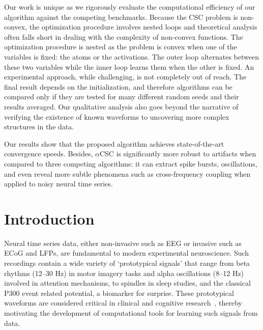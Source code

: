 Our work is unique as we rigorously evaluate the computational efficiency of our algorithm against the competing benchmarks. Because the \ac{CSC} problem is non-convex, the optimization procedure involves nested loops and theoretical analysis often falls short in dealing with the complexity of non-convex functions. 
The optimization procedure is nested as the problem is convex when one of the variables is fixed: the atoms or the activations. The outer loop alternates between these two variables while the inner loop learns them when the other is fixed. An experimental approach, while challenging, is not completely out of reach. The final result depends on the initialization, and therefore algorithms can be compared only if they are tested for many different random seeds and their results averaged. Our qualitative analysis also goes beyond the narrative of verifying the existence of known waveforms to uncovering more complex structures in the data.

Our results
show that the proposed algorithm achieves state-of-the-art convergence speeds. Besides, $\alpha$CSC is
significantly more robust to artifacts when compared to three competing algorithms: it can extract
spike bursts, oscillations, and even reveal more subtle phenomena such as cross-frequency coupling
when applied to noisy neural time series.


\noindent{}%

\clearpage

\section{Introduction}
\label{sec:alphacsc_intro}
Neural time series data, either non-invasive such as \ac{EEG} 
or invasive such as \ac{ECoG} and \acp{LFP}, are fundamental to modern experimental neuroscience. Such recordings contain a wide variety of `prototypical signals' that range from beta rhythms (12--30 Hz) in motor imagery tasks and alpha oscillations (8--12 Hz) involved in attention mechanisms, to spindles in sleep studies, 
and the classical P300 event related potential, a biomarker for surprise. 
%
These prototypical waveforms are considered critical in clinical and cognitive research~\citep{cole2017brain}, thereby motivating the development of computational tools for learning such signals from data.


